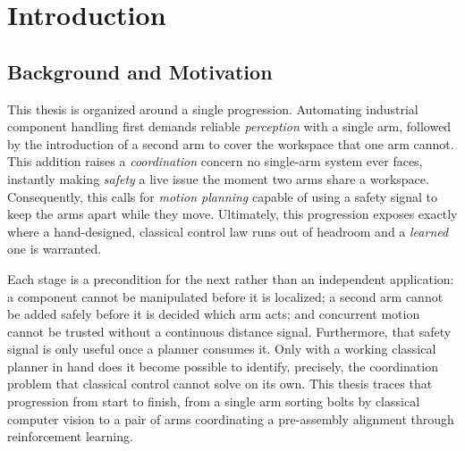 \chapter{Introduction}

\section{Background and Motivation}\label{sec:intro_motivation}

This thesis is organized around a single progression. Automating industrial component handling first demands reliable \emph{perception} with a single arm, followed by the introduction of a second arm to cover the workspace that one arm cannot. This addition raises a \emph{coordination} concern no single-arm system ever faces, instantly making \emph{safety} a live issue the moment two arms share a workspace. Consequently, this calls for \emph{motion planning} capable of using a safety signal to keep the arms apart while they move. Ultimately, this progression exposes exactly where a hand-designed, classical control law runs out of headroom and a \emph{learned} one is warranted.

Each stage is a precondition for the next rather than an independent application: a component cannot be manipulated before it is localized; a second arm cannot be added safely before it is decided which arm acts; and concurrent motion cannot be trusted without a continuous distance signal. Furthermore, that safety signal is only useful once a planner consumes it. Only with a working classical planner in hand does it become possible to identify, precisely, the coordination problem that classical control cannot solve on its own. This thesis traces that progression from start to finish, from a single arm sorting bolts by classical computer vision to a pair of arms coordinating a pre-assembly alignment through reinforcement learning.


